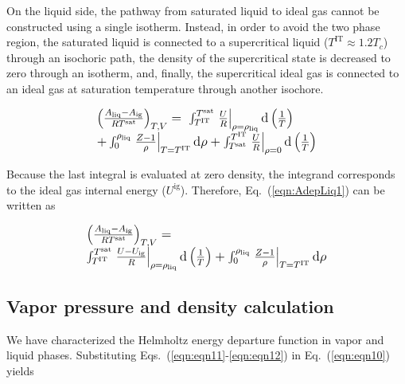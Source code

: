 \documentclass[5p,times]{elsarticle}
\begin{document}
On the liquid side, the pathway from saturated liquid to ideal gas cannot be constructed using a single isotherm. Instead, in order to avoid the two phase region, the saturated liquid is connected to a supercritical liquid ($T^\mathrm{IT} \approx 1.2 T_{c}$) through an isochoric path, the density of the supercritical state is decreased to zero through an isotherm, and, finally, the supercritical ideal gas is connected to an ideal gas at saturation temperature through another isochore.
 
\begin{equation}
\begingroup
\large
\begin{array}{l}
\left( \frac{A_\mathrm{liq} -A_\mathrm{ig} }{RT^\mathrm{sat}} \right)_{T,V} =\; \int _{T^{\mathrm{IT}}}^{T^{\mathrm{\mathrm{sat}}}
} \left.\frac{U}{R} \right\vert_{\rho={\rho_\mathrm{liq}}} \mathrm{d} \left(\frac{1}{T} \right)
\\ 
+ \int _{0}^{\rho _{\mathrm{liq}} } \left.\frac{Z-1}{\rho }\right\vert_{T=T^{\mathrm{IT}}} \mathrm{d}\rho + \int _{T^{\mathrm{sat}}}^{T^{\mathrm{\mathrm{IT}}}
} \left. \frac{U}{R} \right\vert_{\rho=0} \mathrm{d} \left(\frac{1}{T} \right) 
\end{array} 
\endgroup
\label{eqn:AdepLiq1}
\end{equation}

Because the last integral is evaluated at zero density, the integrand corresponds to the ideal gas internal energy ($U^\mathrm{ig}$). Therefore, Eq.~(\ref{eqn:AdepLiq1}) can be written as

\begin{equation}
\begingroup
\large
\begin{array}{l}
\left( \frac{A_\mathrm{liq} -A_\mathrm{ig} }{RT^\mathrm{sat}} \right)_{T,V} =
\\
\int _{T^{\mathrm{IT}}}^{T^{\mathrm{\mathrm{sat}}}
} \left. \frac{U-U_\mathrm{ig}}{R} \right\vert_{\rho=\rho_{\mathrm{liq}}} \mathrm{d} \left(\frac{1}{T} \right) + \int _{0}^{\rho _{\mathrm{liq}} } \left. \frac{Z-1}{\rho } \right\vert_{T=T^{\mathrm{IT}}} \mathrm{d}\rho   
\end{array} 
\endgroup
\label{eqn:AdepLiq2}
\end{equation}

\subsection{Vapor pressure and density calculation}
We have characterized the Helmholtz energy departure function in vapor and liquid phases. Substituting Eqs.~(\ref{eqn:eqn11}-\ref{eqn:eqn12}) in Eq.~(\ref{eqn:eqn10}) yields
\end{document}
